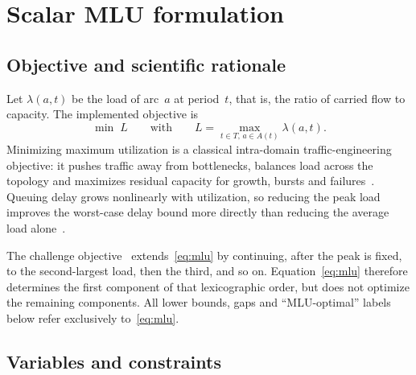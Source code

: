 \section{Scalar MLU formulation}
\label{sec:obj}

\subsection{Objective and scientific rationale}

Let $\lambda(a,t)$ be the load of arc~$a$ at period~$t$, that is, the ratio of carried flow
to capacity.
The implemented objective is
\begin{equation}
\min\; L
\qquad\text{with}\qquad
L=\max_{t\in T,\,a\in A(t)}\lambda(a,t).
\label{eq:mlu}
\end{equation}
Minimizing maximum utilization is a classical intra-domain traffic-engineering objective:
it pushes traffic away from bottlenecks, balances load across the topology and maximizes
residual capacity for growth, bursts and failures~\citep{fortz2002te,texcp2005}.
Queuing delay grows nonlinearly with utilization, so reducing the peak load improves the
worst-case delay bound more directly than reducing the average load alone~\citep{fortz2002te}.

The challenge objective~\citep{orange2026} extends~\eqref{eq:mlu} by continuing, after the
peak is fixed, to the second-largest load, then the third, and so on.
Equation~\eqref{eq:mlu} therefore determines the first component of that lexicographic order,
but does not optimize the remaining components.
All lower bounds, gaps and ``MLU-optimal'' labels below refer exclusively to~\eqref{eq:mlu}.

\subsection{Variables and constraints}

